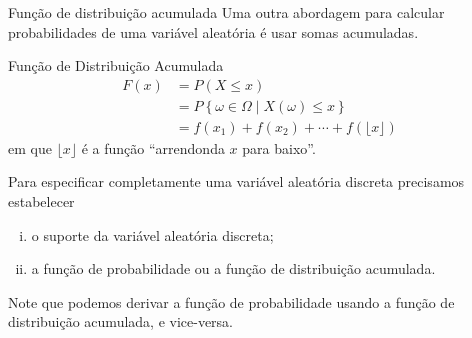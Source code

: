 \documentclass[9pt]{beamer}
\begin{document}
\begin{frame}{Função de distribuição acumulada}
Uma outra abordagem para calcular probabilidades de uma variável aleatória é usar somas acumuladas.
\begin{block}{Função de Distribuição Acumulada}
	\begin{align*}
	F(x) &= P(X \leq x)\\
	&= P\left\{ \omega \in \Omega \mid X(\omega) \leq x \right\}\\
	&= f(x_1) + f(x_2) + \cdots + f\left( \lfloor x \rfloor \right)
	\end{align*}
	em que $\lfloor x \rfloor$ é a função ``arrendonda $x$ para baixo''.
\end{block}
\begin{block}{ }
	Para especificar completamente uma variável aleatória discreta precisamos estabelecer 
	\begin{enumerate}[i.]
	 \item o suporte da variável aleatória discreta;
	 \item a função de probabilidade ou a função de distribuição acumulada.
	\end{enumerate}
  Note que podemos derivar a função de probabilidade usando a função de distribuição acumulada, e vice-versa.
\end{block}
\end{frame}
\end{document}
